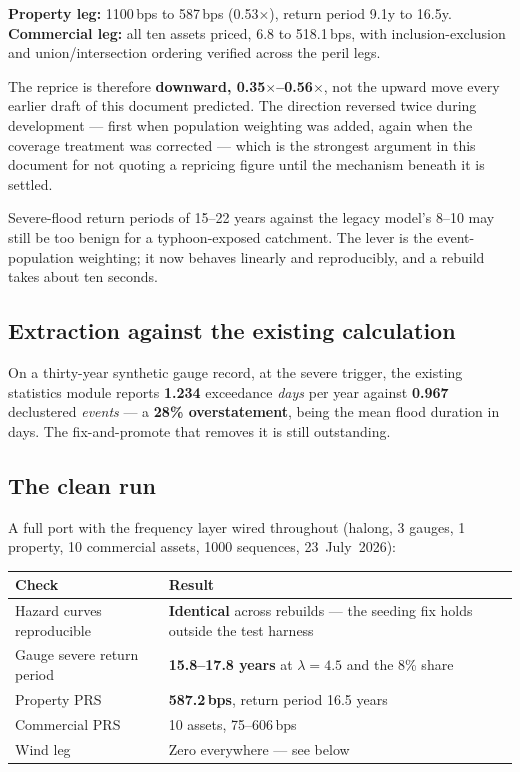 \documentclass[11pt]{article}
\begin{document}
\noindent \textbf{Property leg:} 1100\,bps to 587\,bps (0.53$\times$), return
period 9.1y to 16.5y. \textbf{Commercial leg:} all ten assets priced, 6.8 to
518.1\,bps, with inclusion-exclusion and union/intersection ordering verified
across the peril legs.

The reprice is therefore \textbf{downward, 0.35$\times$--0.56$\times$}, not the
upward move every earlier draft of this document predicted. The direction
reversed twice during development --- first when population weighting was added,
again when the coverage treatment was corrected --- which is the strongest
argument in this document for not quoting a repricing figure until the mechanism
beneath it is settled.

Severe-flood return periods of 15--22 years against the legacy model's 8--10 may
still be too benign for a typhoon-exposed catchment. The lever is the
event-population weighting; it now behaves linearly and reproducibly, and a
rebuild takes about ten seconds.

\subsection{Extraction against the existing calculation}

On a thirty-year synthetic gauge record, at the severe trigger, the existing
statistics module reports \textbf{1.234} exceedance \emph{days} per year against
\textbf{0.967} declustered \emph{events} --- a \textbf{28\% overstatement},
being the mean flood duration in days. The fix-and-promote that removes it is
still outstanding.

\subsection{The clean run}

A full port with the frequency layer wired throughout (halong, 3 gauges, 1
property, 10 commercial assets, 1000 sequences, 23~July~2026):

\begin{center}
\begin{tabular}{@{}lp{}@{}}
\toprule
\textbf{Check} & \textbf{Result} \\
\midrule
Hazard curves reproducible & \textbf{Identical} across rebuilds --- the seeding fix holds outside the test harness \\
Gauge severe return period & \textbf{15.8--17.8 years} at $\lambda = 4.5$ and the 8\% share \\
Property PRS & \textbf{587.2\,bps}, return period 16.5 years \\
Commercial PRS & 10 assets, 75--606\,bps \\
Wind leg & Zero everywhere --- see below \\
\bottomrule
\end{tabular}
\end{center}
\end{document}
